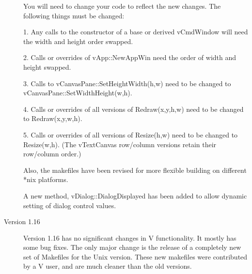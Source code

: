\begin{description}
You will need to change your code to reflect the new changes.
The following things must be changed:

1. Any calls to the constructor of a base or derived vCmdWindow
will need the width and height order swapped.

2. Calls or overrides of vApp::NewAppWin need the
order of width and height swapped.

3. Calls to vCanvasPane::SetHeightWidth(h,w) need to be
changed to vCanvasPane::SetWidthHeight(w,h).

4. Calls or overrides of all versions of Redraw(x,y,h,w)
need to be changed to Redraw(x,y,w,h).

5. Calls or overrides of all versions of Resize(h,w)
need to be changed to Resize(w,h). (The vTextCanvas
row/column versions retain their row/column order.)

Also, the makefiles have been revised for more flexible
building on different *nix platforms.

A new method, vDialog::DialogDisplayed has been added to
allow dynamic setting of dialog control values.

\item[Version 1.16]

Version 1.16 has no significant changes in V functionality.
It mostly has some bug fixes. The only major change is
the release of a completely new set of Makefiles for
the Unix version. These new makefiles were contributed by
a V user, and are much cleaner than the old versions.


\end{description}
